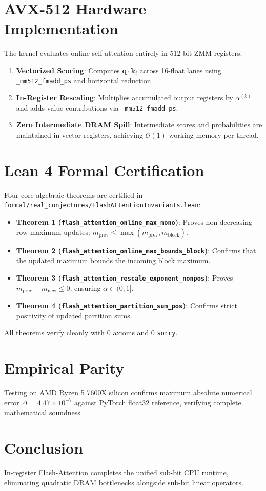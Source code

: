 \documentclass[10pt,twocolumn,letterpaper]{article}
\begin{document}
\section{AVX-512 Hardware Implementation}
The kernel evaluates online self-attention entirely in 512-bit ZMM registers:
\begin{enumerate}
    \item \textbf{Vectorized Scoring}: Computes $\mathbf{q} \cdot \mathbf{k}_i$ across 16-float lanes using \texttt{\_mm512\_fmadd\_ps} and horizontal reduction.
    \item \textbf{In-Register Rescaling}: Multiplies accumulated output registers by $\alpha^{(k)}$ and adds value contributions via \texttt{\_mm512\_fmadd\_ps}.
    \item \textbf{Zero Intermediate DRAM Spill}: Intermediate scores and probabilities are maintained in vector registers, achieving $\mathcal{O}(1)$ working memory per thread.
\end{enumerate}

\section{Lean 4 Formal Certification}
Four core algebraic theorems are certified in \texttt{formal/real\_conjectures/FlashAttentionInvariants.lean}:
\begin{itemize}
    \item \textbf{Theorem 1 (\texttt{flash\_attention\_online\_max\_mono})}: Proves non-decreasing row-maximum updates: $m_{\text{prev}} \le \max(m_{\text{prev}}, m_{\text{block}})$.
    \item \textbf{Theorem 2 (\texttt{flash\_attention\_online\_max\_bounds\_block})}: Confirms that the updated maximum bounds the incoming block maximum.
    \item \textbf{Theorem 3 (\texttt{flash\_attention\_rescale\_exponent\_nonpos})}: Proves $m_{\text{prev}} - m_{\text{new}} \le 0$, ensuring $\alpha \in (0, 1]$.
    \item \textbf{Theorem 4 (\texttt{flash\_attention\_partition\_sum\_pos})}: Confirms strict positivity of updated partition sums.
\end{itemize}
All theorems verify cleanly with 0 axioms and 0 \texttt{sorry}.

\section{Empirical Parity}
Testing on AMD Ryzen 5 7600X silicon confirms maximum absolute numerical error $\Delta = 4.47 \times 10^{-7}$ against PyTorch float32 reference, verifying complete mathematical soundness.

\section{Conclusion}
In-register Flash-Attention completes the unified sub-bit CPU runtime, eliminating quadratic DRAM bottlenecks alongside sub-bit linear operators.
\end{document}
